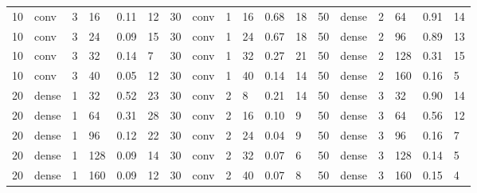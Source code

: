 \begin{table}
{\begin{tabular}{@{}llllll|llllll|llllll@{}}
10          & conv       & 3          & 16         & 0.11         & 12           & 30          & conv       & 1          & 16         & 0.68         & 18           & 50          & dense      & 2          & 64         & 0.91         & 14           \\
10          & conv       & 3          & 24         & 0.09         & 15           & 30          & conv       & 1          & 24         & 0.67         & 18           & 50          & dense      & 2          & 96         & 0.89         & 13           \\
10          & conv       & 3          & 32         & 0.14         & 7            & 30          & conv       & 1          & 32         & 0.27         & 21           & 50          & dense      & 2          & 128        & 0.31         & 15           \\
10          & conv       & 3          & 40         & 0.05         & 12           & 30          & conv       & 1          & 40         & 0.14         & 14           & 50          & dense      & 2          & 160        & 0.16         & 5            \\
20          & dense      & 1          & 32         & 0.52         & 23           & 30          & conv       & 2          & 8          & 0.21         & 14           & 50          & dense      & 3          & 32         & 0.90         & 14           \\
20          & dense      & 1          & 64         & 0.31         & 28           & 30          & conv       & 2          & 16         & 0.10         & 9            & 50          & dense      & 3          & 64         & 0.56         & 12           \\
20          & dense      & 1          & 96         & 0.12         & 22           & 30          & conv       & 2          & 24         & 0.04         & 9            & 50          & dense      & 3          & 96         & 0.16         & 7            \\
20          & dense      & 1          & 128        & 0.09         & 14           & 30          & conv       & 2          & 32         & 0.07         & 6            & 50          & dense      & 3          & 128        & 0.14         & 5            \\
20          & dense      & 1          & 160        & 0.09         & 12           & 30          & conv       & 2          & 40         & 0.07         & 8            & 50          & dense      & 3          & 160        & 0.15         & 4            \\

\end{tabular}}
\end{table}
